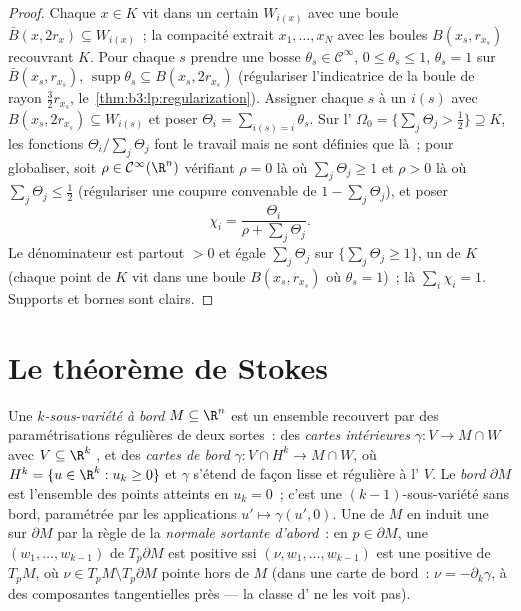 \begin{proof}
Chaque $x \in K$ vit dans un certain $W_{i(x)}$ avec une
boule  $\bar B(x, 2r_x) \subseteq W_{i(x)}$~; la
compacité extrait $x_1, \dots, x_N$ avec les boules $B(x_s,
r_{x_s})$ recouvrant $K$. Pour chaque $s$ prendre une bosse
$\theta_s \in \mathcal C^\infty$, $0 \leq \theta_s \leq 1$,
$\theta_s = 1$ sur $\bar B(x_s, r_{x_s})$,
$\operatorname{supp}\theta_s \subseteq B(x_s, 2r_{x_s})$
(régulariser l'indicatrice de la boule de rayon
$\frac32r_{x_s}$, le~\cref{thm:b3:lp:regularization}). Assigner
chaque $s$ à un  $i(s)$ avec $B(x_s, 2r_{x_s})
\subseteq W_{i(s)}$ et poser $\Theta_i = \sum_{i(s) =
i}\theta_s$. Sur l' $\Omega_0 = \{\sum_j\Theta_j >
\tfrac12\} \supseteq K$, les fonctions
$\Theta_i/\sum_j\Theta_j$ font le travail mais ne sont
définies que là~; pour globaliser, soit $\rho \in \mathcal
C^\infty(\R^n)$ vérifiant $\rho = 0$ là où $\sum_j\Theta_j
\geq 1$ et $\rho > 0$ là où $\sum_j\Theta_j \leq \tfrac12$
(régulariser une coupure convenable de $1 - \sum_j\Theta_j$),
et poser
\[
\chi_i = \frac{\Theta_i}{\rho + \sum_j\Theta_j} .
\]
Le dénominateur est partout $> 0$ et égale $\sum_j\Theta_j$
sur $\{\sum_j\Theta_j \geq 1\}$, un   de $K$
(chaque point de $K$ vit dans une boule $B(x_s, r_{x_s})$ où
$\theta_s = 1$)~; là $\sum_i\chi_i = 1$. Supports et bornes
sont clairs.
\end{proof}

\section{Le théorème de Stokes}

\begin{definition}\label{def:b3:forms:boundary}
Une \emph{$k$-sous-variété à bord} $M \subseteq \R^n$ est un ensemble recouvert par des
paramétrisations régulières de deux sortes~: des
\emph{cartes intérieures} $\gamma\colon V \to M \cap W$
avec $V \subseteq \R^k$ , et des \emph{cartes de bord}
$\gamma\colon V \cap H^k \to M \cap W$, où $H^k = \{u \in
\R^k : u_k \geq 0\}$ et $\gamma$ s'étend de façon lisse et
régulière à l' $V$. Le \emph{bord} $\partial M$ est
l'ensemble des points atteints en $u_k = 0$~; c'est une
$(k-1)$-sous-variété sans bord, paramétrée par les
applications $u' \mapsto \gamma(u', 0)$. Une  de
$M$ en induit une sur $\partial M$ par la règle de la
\emph{normale sortante d'abord}~: en $p \in \partial M$, une
 $(w_1, \dots, w_{k-1})$ de $T_p\partial M$ est positive
ssi $(\nu, w_1, \dots, w_{k-1})$ est une  positive de
$T_pM$, où $\nu \in T_pM \setminus T_p\partial M$ pointe
hors de $M$ (dans une carte de bord~: $\nu =
-\partial_k\gamma$, à des composantes tangentielles près ---
la classe d' ne les voit pas).
\end{definition}

